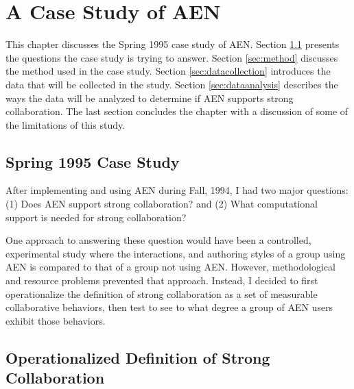 
\newpage

\chapter{A Case Study of AEN}
\label{sec:evaluation}

This chapter discusses the Spring 1995 case study of AEN.  Section
\ref{sec:casestudy} presents the questions the case study is trying to
answer.  Section \ref{sec:method} discusses the method used in the case
study.  Section \ref{sec:datacollection} introduces the data that will be
collected in the study.  Section \ref{sec:dataanalysis} describes the ways
the data will be analyzed to determine if AEN supports strong
collaboration.  The last section concludes the chapter with a discussion of
some of the limitations of this study.

\section{Spring 1995 Case Study}
\label{sec:casestudy}

After implementing and using AEN during Fall, 1994, I had two major
questions: (1) Does AEN support strong collaboration? and (2) What
computational support is needed for strong collaboration?

One approach to answering these question would have been a controlled,
experimental study where the interactions, and authoring styles of a group
using AEN is compared to that of a group not using AEN.  However,
methodological and resource problems prevented that approach.  Instead, I
decided to first operationalize the definition of strong collaboration as a
set of measurable collaborative behaviors, then test to see to what degree
a group of AEN users exhibit those behaviors.  

\section{Operationalized Definition of Strong Collaboration}
\label{sec:operationalized-definition}
 
